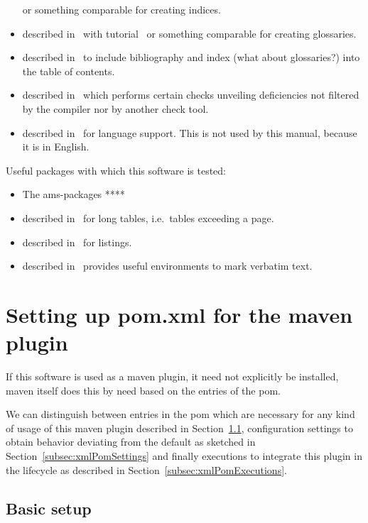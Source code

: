 \begin{itemize}
or something comparable for creating indices. 
\item 
{} described in~\cite{GloP} 
with tutorial~\cite{GloPGuide}
or something comparable for creating glossaries. 
\item 
{} described in~\cite{TocBibIndP} 
to include bibliography and index (what about glossaries?) 
into the table of contents. 
\item 
{} described in~\cite{NagP} 
which performs certain checks unveiling deficiencies 
not filtered by the compiler nor by another check tool. 
\item 
{} described in~\cite{BabelP} for language support. 
This is not used by this manual, because it is in English. 
\end{itemize}

\noindent
Useful packages with which this software is tested: 
%
\begin{itemize}
\item
The ams-packages **** 
\item
{} described in~\cite{LongTabP} 
for long tables, i.e.~tables exceeding a page. 
\item
{} described in~\cite{ListingsP} for listings. 
\item
{} described in~\cite{FancyVerbP} 
provides useful environments to mark verbatim text. 
\end{itemize}


\section{Setting up pom.xml for the maven plugin}\label{sec:xmlPom}

If this software is used as a maven plugin,
it need not explicitly be installed, maven itself does this by need
based on the entries of the pom. 

We can distinguish between entries in the pom 
which are necessary for any kind of usage of this maven plugin 
described in Section~\ref{subsec:xmlPomBasic}, 
configuration settings to obtain behavior deviating from the default 
as sketched in Section~\ref{subsec:xmlPomSettings} 
and finally executions to integrate this plugin in the lifecycle 
as described in Section~\ref{subsec:xmlPomExecutions}. 

\subsection{Basic setup}\label{subsec:xmlPomBasic}

